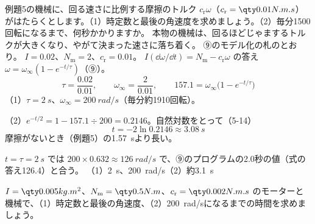 \begin{phreidai}[摩擦があるときの立ち上がり]
\label{ph:力-6:ex6}例題5の機械に、回る速さに比例する摩擦のトルク $c_{\mathrm r}\omega$（$c_{\mathrm r}=\pxgu{0.01}{N.m.s}$）がはたらくとします。（1）時定数と最後の角速度を求めましょう。（2）毎分1500回転になるまで、何秒かかりますか。
\phbamen
本物の機械は、回るほどじゃまするトルクが大きくなり、やがて決まった速さに落ち着く。
\phmushi
⑨のモデル化の札のとおり。
\phzu
$I=0.02$、$N_{\mathrm m}=2$、$c_{\mathrm r}=0.01$。
\phriyu
$I(\dd\omega/\dd t)=N_{\mathrm m}-c_{\mathrm r}\omega$ の答え $\omega=\omega_\infty(1-e^{-t/\tau})$（⑨）。
\phtateru
\[ \tau=\frac{0.02}{0.01},\qquad\omega_\infty=\frac{2}{0.01},\qquad157.1=\omega_\infty\bigl(1-e^{-t/\tau}\bigr) \]
\phtoku
（1）$\tau=\qty{2}{s}$、$\omega_\infty=\qty{200}{rad/s}$（毎分約1910回転）。\par
（2）$e^{-t/2}=1-157.1\div200=0.2146$。自然対数をとって（5-14）
\[ t=-2\ln0.2146\approx\qty{3.08}{s} \]
\phtashikame
摩擦がないとき（例題5）の\qty{1.57}{s}より長い。\par
$t=\tau=\qty{2}{s}$ では $200\times0.632\approx\qty{126}{rad/s}$ で、⑨のプログラムの2.0秒の値（式の答え126.4）と合う。
\kotae （1）\qty{2}{s}、\qty{200}{rad/s}\quad（2）約\qty{3.1}{s}
\end{phreidai}
\begin{jibun}
$I=\pxgI{0.005}$、$N_{\mathrm m}=\pxgNm{0.5}$、$c_{\mathrm r}=\pxgu{0.002}{N.m.s}$ のモーターと機械で、（1）時定数と最後の角速度、（2）\qty{200}{rad/s}になるまでの時間を求めましょう。
\end{jibun}

